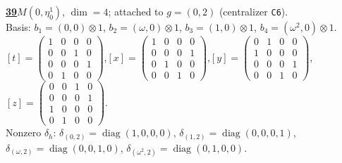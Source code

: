 \begin{samepage}\noindent\textbf{\underline{39}}\quad $M(0,\eta^{1}_{0})$, $\dim=4$; attached to $g=(0,2)$ (centralizer \texttt{C6}).\\
Basis: $b_{1}=(0,0)\otimes 1$, $b_{2}=(\omega,0)\otimes 1$, $b_{3}=(1,0)\otimes 1$, $b_{4}=(\omega^2,0)\otimes 1$.\\
$[t]=\left(\begin{smallmatrix} 1 & 0 & 0 & 0 \\ 0 & 0 & 1 & 0 \\ 0 & 0 & 0 & 1 \\ 0 & 1 & 0 & 0 \end{smallmatrix}\right)$,\quad $[x]=\left(\begin{smallmatrix} 1 & 0 & 0 & 0 \\ 0 & 0 & 0 & 1 \\ 0 & 1 & 0 & 0 \\ 0 & 0 & 1 & 0 \end{smallmatrix}\right)$,\quad $[y]=\left(\begin{smallmatrix} 0 & 1 & 0 & 0 \\ 1 & 0 & 0 & 0 \\ 0 & 0 & 0 & 1 \\ 0 & 0 & 1 & 0 \end{smallmatrix}\right)$,\quad $[z]=\left(\begin{smallmatrix} 0 & 0 & 1 & 0 \\ 0 & 0 & 0 & 1 \\ 1 & 0 & 0 & 0 \\ 0 & 1 & 0 & 0 \end{smallmatrix}\right)$.\\
Nonzero $\delta_h$: $\delta_{(0,2)}=\operatorname{diag}(1,0,0,0)$, $\delta_{(1,2)}=\operatorname{diag}(0,0,0,1)$, $\delta_{(\omega,2)}=\operatorname{diag}(0,0,1,0)$, $\delta_{(\omega^2,2)}=\operatorname{diag}(0,1,0,0)$.\end{samepage}
\medskip

